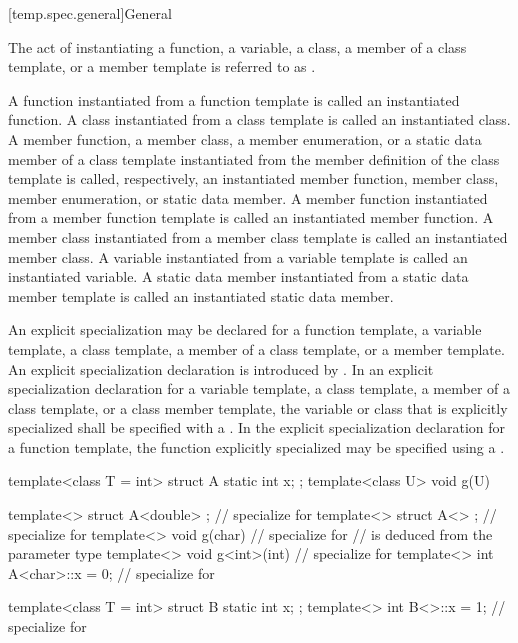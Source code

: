 [temp.spec.general]{General}

\pnum
{}%
The act of instantiating a function, a variable,
a class, a member of a class template, or
a member template is referred to as
.

\pnum
A function instantiated from a function template is called an instantiated
function.
A class instantiated from a class template is called an instantiated class.
A member function, a member class, a member enumeration, or a static data member of a class template
instantiated from the member definition of the class template is called,
respectively, an instantiated member function, member class, member enumeration, or static data
member.
A member function instantiated from a member function template is called an
instantiated member function.
A member class instantiated from a member class template is called an
instantiated member class.
A variable instantiated from a variable template is called an
instantiated variable.
A static data member instantiated from a static data member template
is called an instantiated static data member.

\pnum
An explicit specialization may be declared for a function template,
a variable template, a class template, a member of a class template, or
a member template.
An explicit specialization declaration is introduced by
.
In an explicit specialization declaration for
a variable template, a class template,
a member of a class template, or a class member template,
the variable or class that is explicitly specialized
shall be specified with a .
In the explicit specialization declaration for a function template,
the function explicitly specialized may be specified using a .
\begin{example}
\begin{codeblock}
template<class T = int> struct A {
  static int x;
};
template<class U> void g(U) { }

template<> struct A<double> { };        // specialize for 
template<> struct A<> { };              // specialize for 
template<> void g(char) { }             // specialize for 
                                        //  is deduced from the parameter type
template<> void g<int>(int) { }         // specialize for 
template<> int A<char>::x = 0;          // specialize for 

template<class T = int> struct B {
  static int x;
};
template<> int B<>::x = 1;              // specialize for 
\end{codeblock}
\end{example}

